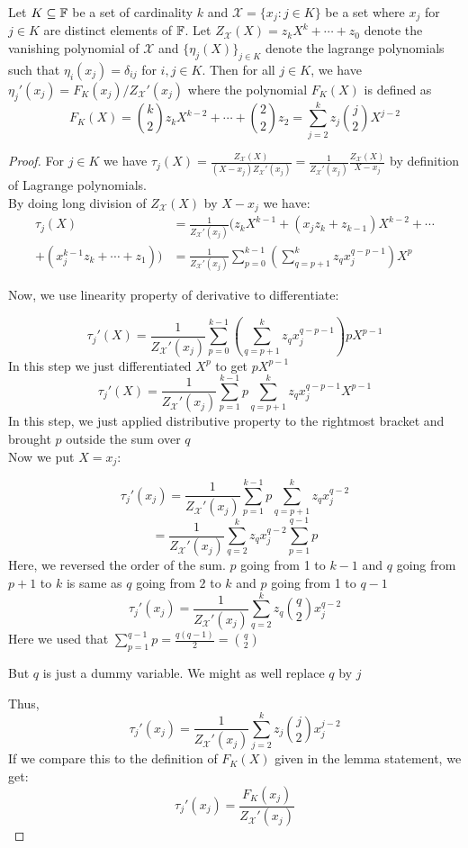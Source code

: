 \begin{lemma}\label{lem:tau}
Let $K\subseteq \mathbb{F}$ be a set of cardinality $k$ and $\mathcal{X}=\{x_j:j\in K\}$ be a set
where $x_j$ for $j\in K$ are distinct elements of $\mathbb{F}$. Let $Z_\mathcal{X}(X)=z_k X^k+\cdots+z_0$ denote the vanishing polynomial of $\mathcal{X}$
and $\{\eta_j(X)\}_{j\in K}$ denote the lagrange polynomials such that $\eta_i(x_j)=\delta_{ij}$ for $i,j\in K$. Then for all $j\in K$,
we have $\eta_j'(x_j)=F_K(x_j)/Z_\mathcal{X}'(x_j)$ where the polynomial
$F_K(X)$ is defined as
\[F_K(X)=\binom{k}{2}z_k X^{k-2}+\cdots+\binom{2}{2}z_2=\sum_{j=2}^k z_j\binom{j}{2}X^{j-2} \]
\end{lemma}
\begin{proof}
    For $j\in K$ we have $\tau_j(X)=\frac{Z_\mathcal{X}(X)}{(X-x_j)Z_\mathcal{X}'(x_j)}= \frac{1}{Z_\mathcal{X}'(x_j)}\frac{Z_\mathcal{X}(X)}{X-x_j}$ by definition of Lagrange polynomials.\\
    By doing long division of $Z_\mathcal{X}(X)$
    by $X-x_j$ we have:
    \begin{align*}
        \tau_j(X) &= \frac{1}{Z_\mathcal{X}'(x_j)}\big(z_k X^{k-1} + (x_jz_k + z_{k-1})X^{k-2} + \cdots\\ +
        (x_j^{k-1}z_k + \cdots + z_1)\big)
        &= \frac{1}{Z_\mathcal{X}'(x_j)}\sum_{p=0}^{k-1} \left(\sum_{q=p+1}^k z_q x_j^{q-p-1}\right)X^p
    \end{align*}

    Now, we use linearity property of derivative to differentiate:

    $$   \tau_j'(X) = \frac{1}{Z_\mathcal{X}'(x_j)}\sum_{p=0}^{k-1} \left(\sum_{q=p+1}^{k}z_q x_j^{q-p-1}\right)p X^{p-1} $$
    In this step we just differentiated $X^p$ to get $p X^{p-1}$
    $$ \tau_j'(X) = \frac{1}{Z_\mathcal{X}'(x_j)}\sum_{p=1}^{k-1} p  \sum_{q=p+1}^{k}z_q x_j^{q-p-1} X^{p-1} $$
    In this step, we just applied distributive property to the rightmost bracket and brought $p$ outside the sum over $q$\\
    Now we put $X=x_j$:

    $$\tau_j'(x_j) = \frac{1}{Z_\mathcal{X}'(x_j)} \sum_{p=1}^{k-1} p \sum_{q=p+1}^k z_q x_j^{q-2} $$
    $$= \frac{1}{Z_\mathcal{X}'(x_j)}\sum_{q=2}^k z_q x_j^{q-2} \sum_{p=1}^{q-1} p $$
    Here, we reversed the order of the sum. $p$ going from 1 to $k-1$ and $q$ going from $p+1$ to $k$ is same as $q$ going from $2$ to $k$ and $p$ going from 1 to $q-1$
    $$\tau_j'(x_j)= \frac{1}{Z_\mathcal{X}'(x_j)}\sum_{q=2}^k z_q \binom{q}{2} x_j^{q-2} $$
    Here we used that $\sum_{p=1}^{q-1}p=\frac{q(q-1)}{2}=\binom{q}{2}$

    But $q$ is just a dummy variable. We might as well replace $q$ by $j$

    Thus, $$\tau_j'(x_j)= \frac{1}{Z_\mathcal{X}'(x_j)}\sum_{j=2}^k z_j \binom{j}{2} x_j^{j-2} $$
    If we compare this to the definition of $F_K(X)$ given in the lemma statement, we get:
    $$\tau_j'(x_j)= \frac{F_K(x_j)}{Z_\mathcal{X}'(x_j)}$$


\end{proof}

